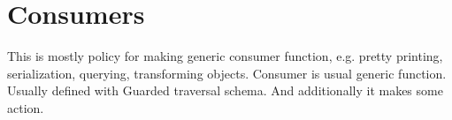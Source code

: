 \documentclass[a4paper]{article}
\begin{document}
\begin{comment}
Such behaviour can be turned on by specializing template ImplicitStack to true. 
See Generate function for example. Generate function needs changes of the size 
parameter will be visible only for once concrete object and all its children. 
But not for upper level.

If the template argument is set object that implements the strategy is copied
for each level and it's discarded then the level is traversed. Of course it shell
support copying.

Global changes are still possible for such strategy. They can be modeled by storing 
references to values but not values themselves.

\subsection{Contextual traversal}

This strategy is subclass of Guarded strategy. So it also uses \emph{before} and 
\emph{after} methods. But additionally it calls \emph{context} method for each sub object.
The method has 2 parameters. The first one is parent for current object and the second
is actually current object. So this is only one level contextual traversal. 

It's not a big problem to implement arbitrary level traversal, but we need to
find out use cases for it.

Using such strategy introduces trouble for polymorphic methods. Now dependency list
for any polymorphic type should be extended with FunName::Child<Param Type>. This can
be done automatically by generic function but this is not implemented yet. For arbitrary
level traversal it's not solvable at all, so we'll have to use dynamic dispatch mechanism
for implementation if it will be required.

\subsection{Using C++ functors for making generic functions}

It's not implemented yet.

\todo{}

\end{comment}

\section{Consumers}

This is mostly policy for making generic consumer function, e.g. pretty printing, serialization, querying, transforming objects.
Consumer is usual generic function. Usually defined with Guarded traversal schema. And additionally
it makes some action.
\end{document}
